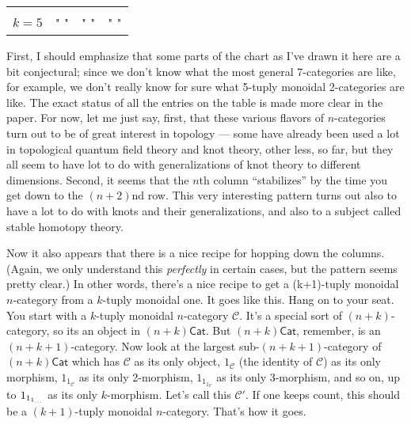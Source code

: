 \documentclass{article}
\begin{document}
\begin{longtable}[]{@{}llll@{}}
\begin{minipage}[t]{0.21\columnwidth}
\strut
\end{minipage}\tabularnewline
\begin{minipage}[t]{0.26\columnwidth}\raggedright
\(k=5\)\strut
\end{minipage} & \begin{minipage}[t]{0.21\columnwidth}\raggedright
" "\strut
\end{minipage} & \begin{minipage}[t]{0.21\columnwidth}\raggedright
" "\strut
\end{minipage} & \begin{minipage}[t]{0.21\columnwidth}\raggedright
" "\strut
\end{minipage}\tabularnewline
\bottomrule
\end{longtable}

First, I should emphasize that some parts of the chart as I've drawn it
here are a bit conjectural; since we don't know what the most general
7-categories are like, for example, we don't really know for sure what
5-tuply monoidal 2-categories are like. The exact status of all the
entries on the table is made more clear in the paper. For now, let me
just say, first, that these various flavors of \(n\)-categories turn out
to be of great interest in topology --- some have already been used a
lot in topological quantum field theory and knot theory, other less, so
far, but they all seem to have lot to do with generalizations of knot
theory to different dimensions. Second, it seems that the \(n\)th column
``stabilizes'' by the time you get down to the \((n+2)\)nd row. This
very interesting pattern turns out also to have a lot to do with knots
and their generalizations, and also to a subject called stable homotopy
theory.

Now it also appears that there is a nice recipe for hopping down the
columns. (Again, we only understand this \emph{perfectly} in certain
cases, but the pattern seems pretty clear.) In other words, there's a
nice recipe to get a (k+1)-tuply monoidal \(n\)-category from a
\(k\)-tuply monoidal one. It goes like this. Hang on to your seat. You
start with a \(k\)-tuply monoidal \(n\)-category \(\mathcal{C}\). It's a
special sort of \((n+k)\)-category, so its an object in
\((n+k)\mathsf{Cat}\). But \((n+k)\mathsf{Cat}\), remember, is an
\((n+k+1)\)-category. Now look at the largest sub-\((n+k+1)\)-category
of \((n+k)\mathsf{Cat}\) which has \(\mathcal{C}\) as its only object,
\(1_{\mathcal{C}}\) (the identity of \(\mathcal{C}\)) as its only
morphism, \(1_{1_{\mathcal{C}}}\) as its only 2-morphism,
\(1_{1_{1_{\mathcal{C}}}}\) as its only 3-morphism, and so on, up to
\(1_{1_{1_{\scriptsize\ldots}}}\) as its only \(k\)-morphism. Let's call
this \(\mathcal{C}'\). If one keeps count, this should be a
\((k+1)\)-tuply monoidal \(n\)-category. That's how it goes.
\end{document}

